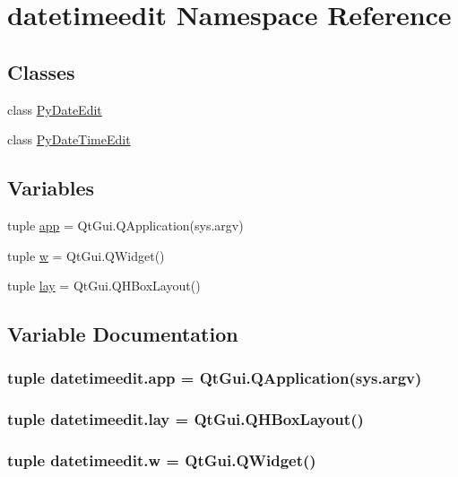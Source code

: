 \hypertarget{namespacedatetimeedit}{}\section{datetimeedit Namespace Reference}
\label{namespacedatetimeedit}
\subsection*{Classes}
\begin{DoxyCompactItemize}
\item 
class \hyperlink{classdatetimeedit_1_1PyDateEdit}{Py\+Date\+Edit}
\item 
class \hyperlink{classdatetimeedit_1_1PyDateTimeEdit}{Py\+Date\+Time\+Edit}
\end{DoxyCompactItemize}
\subsection*{Variables}
\begin{DoxyCompactItemize}
\item 
tuple \hyperlink{namespacedatetimeedit_ad1f01a9dfc2be41ddeabd8097a939627}{app} = Qt\+Gui.\+Q\+Application(sys.\+argv)
\item 
tuple \hyperlink{namespacedatetimeedit_af44c5ae7ca9b909acee8655cae700f68}{w} = Qt\+Gui.\+Q\+Widget()
\item 
tuple \hyperlink{namespacedatetimeedit_affb370314009b6dc6fd5d8aeec02ac86}{lay} = Qt\+Gui.\+Q\+H\+Box\+Layout()
\end{DoxyCompactItemize}


\subsection{Variable Documentation}
\hypertarget{namespacedatetimeedit_ad1f01a9dfc2be41ddeabd8097a939627}{}
\subsubsection[{app}]{\setlength{\rightskip}{0pt plus 5cm}tuple datetimeedit.\+app = Qt\+Gui.\+Q\+Application(sys.\+argv)}\label{namespacedatetimeedit_ad1f01a9dfc2be41ddeabd8097a939627}
\hypertarget{namespacedatetimeedit_affb370314009b6dc6fd5d8aeec02ac86}{}
\subsubsection[{lay}]{\setlength{\rightskip}{0pt plus 5cm}tuple datetimeedit.\+lay = Qt\+Gui.\+Q\+H\+Box\+Layout()}\label{namespacedatetimeedit_affb370314009b6dc6fd5d8aeec02ac86}
\hypertarget{namespacedatetimeedit_af44c5ae7ca9b909acee8655cae700f68}{}
\subsubsection[{w}]{\setlength{\rightskip}{0pt plus 5cm}tuple datetimeedit.\+w = Qt\+Gui.\+Q\+Widget()}\label{namespacedatetimeedit_af44c5ae7ca9b909acee8655cae700f68}
